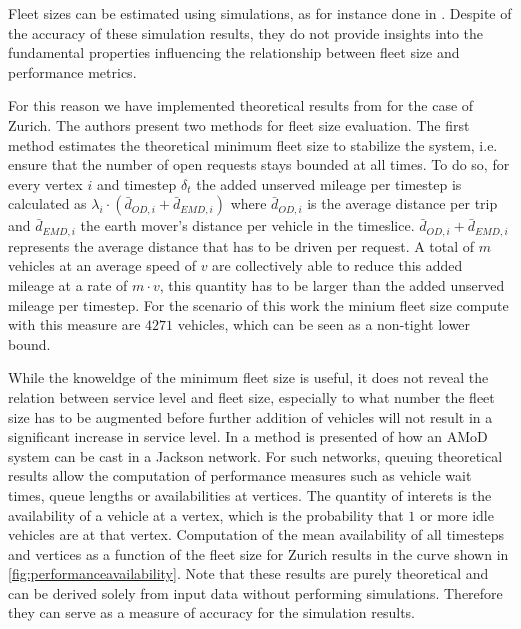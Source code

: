 Fleet sizes can be estimated using simulations, as for instance done in
\citep{bischoff2016simulation}. Despite of the accuracy of these
simulation results, they do not provide insights into the fundamental
properties influencing the relationship between fleet size and performance metrics.

For this reason we have implemented theoretical results from \citep{spieser2014toward}
for the case of Zurich. The authors present two methods for fleet size evaluation.
The first method estimates the theoretical minimum fleet size to stabilize
the system, i.e. ensure that the number of open requests stays bounded at
all times. To do so, for every vertex $i$ and timestep $\delta_t$ the added
unserved mileage per timestep is calculated as
$\lambda_i \cdot ( \bar{d}_{OD,i}  + \bar{d}_{EMD,i})$ where $\bar{d}_{OD,i}$
is the average distance per trip and  $\bar{d}_{EMD,i}$ the earth mover's
distance per vehicle in the timeslice. $\bar{d}_{OD,i}  + \bar{d}_{EMD,i}$
represents the average distance that has to be driven per request. A total of
$m$ vehicles at an average speed of $v$ are collectively able to reduce this
 added mileage at a rate of $m \cdot v$, this quantity has to be larger than the
 added unserved mileage per timestep. For the scenario of this work the
 minium fleet size compute with this measure are $4271$ vehicles, which
 can be seen as a non-tight lower bound.

While the knoweldge of the minimum fleet size is useful, it does not reveal
the relation between service level and fleet size, especially to what number
the fleet size has to be augmented before further addition of vehicles will
not result in a significant increase in service level. In \citep{zhang2016control}
 a method is presented of how an AMoD system can be cast in a Jackson network.
 For such networks, queuing theoretical results allow the computation of
 performance measures such as vehicle wait times, queue lengths or
 availabilities at vertices. The quantity of interets is the availability
 of a vehicle at a vertex, which is the probability that $1$ or more idle
 vehicles are at that vertex. Computation of the mean availability of all
 timesteps and vertices as a function of the fleet size for Zurich results
 in the curve shown in \ref{fig:performanceavailability}. Note that these results are purely theoretical and can be derived solely from input data without performing simulations. Therefore they can serve
as a measure of accuracy for the simulation results.

